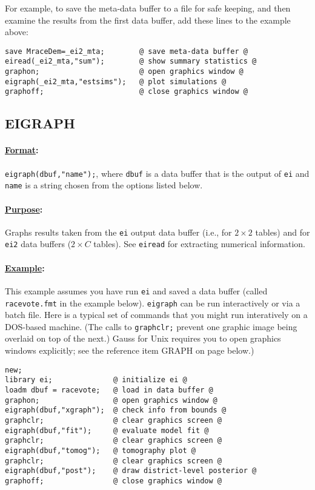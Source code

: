 \documentclass[11pt,titlepage]{article}
\begin{document}
For example, to save the meta-data buffer to a file for safe keeping,
and then examine the results from the first data buffer, add these
lines to the example above:
\begin{verbatim}
save MraceDem=_ei2_mta;        @ save meta-data buffer @
eiread(_ei2_mta,"sum");        @ show summary statistics @
graphon;                       @ open graphics window @
eigraph(_ei2_mta,"estsims");   @ plot simulations @
graphoff;                      @ close graphics window @
\end{verbatim}

\subsection{EIGRAPH} \label{eigraph}

\paragraph{\underline{Format}:} \texttt{eigraph(dbuf,"name");}, where
\texttt{dbuf} is a data buffer that is the output of \texttt{ei} and
\texttt{name} is a string chosen from the options listed below.

\paragraph{\underline{Purpose}:}
Graphs results taken from the \texttt{ei} output data buffer (i.e.,
for $2\times 2$ tables) and for \texttt{ei2} data buffers ($2\times C$
tables).  See \texttt{eiread} for extracting numerical information.

\paragraph{\underline{Example}:}
This example assumes you have run \texttt{ei} and saved a data buffer
(called \texttt{racevote.fmt} in the example below).  \texttt{eigraph}
can be run interactively or via a batch file.  Here is a typical set
of commands that you might run interatively on a DOS-based machine.
(The calls to \texttt{graphclr;} prevent one graphic image being
overlaid on top of the next.)  Gauss for Unix requires you to open
graphics windows explicitly; see the reference item GRAPH on page
\pageref{graph} below.)
\begin{verbatim}
new;
library ei;              @ initialize ei @
loadm dbuf = racevote;   @ load in data buffer @
graphon;                 @ open graphics window @
eigraph(dbuf,"xgraph");  @ check info from bounds @
graphclr;                @ clear graphics screen @
eigraph(dbuf,"fit");     @ evaluate model fit @
graphclr;                @ clear graphics screen @
eigraph(dbuf,"tomog");   @ tomography plot @
graphclr;                @ clear graphics screen @
eigraph(dbuf,"post");    @ draw district-level posterior @
graphoff;                @ close graphics window @
\end{verbatim}
\end{document}
